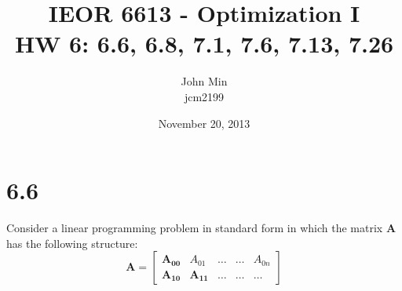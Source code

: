 \documentclass{article}
\begin{document}
\title{IEOR 6613 - Optimization I\\ HW 6:  6.6, 6.8, 7.1, 7.6, 7.13, 7.26}

\author{John Min\\ jcm2199}
\date{November 20, 2013}
\maketitle

\section*{6.6}
Consider a linear programming problem in standard form in which the matrix $\mathbf{A}$ has the following structure: \\
$$ \mathbf{A = } 
\begin{bmatrix} \mathbf{A_{00}} & A_{01} & \ldots & \ldots & A_{0n} \\
				\mathbf{A_{10}} & \mathbf{A_{11}} & \ldots & \ldots & \ldots	
\end{bmatrix} $$
\end{document}
